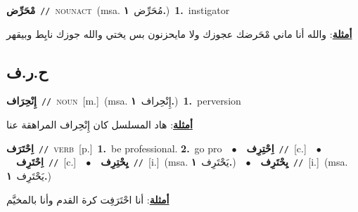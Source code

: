 \documentclass[10pt,a4paper,twoside]{article} %
\begin{document}
\begin{multicols}{2}
{\setlength\topsep{0pt}\textbf{\foreignlanguage{arabic}{مْحَرِّض}}\ {\color{gray}\texttt{//}\color{black}}\ \textsc{noun\textunderscore act}\ \color{gray}(msa. \foreignlanguage{arabic}{مُحَرِّض}~\foreignlanguage{arabic}{\textbf{١.}})\color{black}\ \textbf{1.}~instigator\  \begin{flushright}\color{gray}\foreignlanguage{arabic}{\textbf{\underline{\foreignlanguage{arabic}{أمثلة}}}: والله أنا ماني مْحَرضك عجوزك ولا مايحزنون بس يختي والله جوزك نايِط وبيقهر}\end{flushright}\color{black}} \vspace{2mm}

\vspace{-3mm}
\subsection*{\color{blue}\foreignlanguage{arabic}{ح.ر.ف}\color{blue}{}} 

{\setlength\topsep{0pt}\textbf{\foreignlanguage{arabic}{إِنْحِرَاف}}\ {\color{gray}\texttt{//}\color{black}}\ \textsc{noun}\ [m.]\ \color{gray}(msa. \foreignlanguage{arabic}{إِنْحِراف}~\foreignlanguage{arabic}{\textbf{١.}})\color{black}\ \textbf{1.}~perversion\  \begin{flushright}\color{gray}\foreignlanguage{arabic}{\textbf{\underline{\foreignlanguage{arabic}{أمثلة}}}: هاد المسلسل كان إِنْحِراف المراهقة عنا}\end{flushright}\color{black}} \vspace{2mm}

{\setlength\topsep{0pt}\textbf{\foreignlanguage{arabic}{اِحْتَرَف}}\ {\color{gray}\texttt{//}\color{black}}\ \textsc{verb}\ [p.]\ \textbf{1.}~be professional.  \textbf{2.}~go pro\ \ $\bullet$\ \ \setlength\topsep{0pt}\textbf{\foreignlanguage{arabic}{اِحْتِرِف}}\ {\color{gray}\texttt{//}\color{black}}\ [c.]\ \ $\bullet$\ \ \setlength\topsep{0pt}\textbf{\foreignlanguage{arabic}{اِحْتَرِف}}\ {\color{gray}\texttt{//}\color{black}}\ [c.]\ \ $\bullet$\ \ \setlength\topsep{0pt}\textbf{\foreignlanguage{arabic}{يِحْتِرِف}}\ {\color{gray}\texttt{//}\color{black}}\ [i.]\ \color{gray}(msa. \foreignlanguage{arabic}{يَحْتَرِف}~\foreignlanguage{arabic}{\textbf{١.}})\color{black}\ \ $\bullet$\ \ \setlength\topsep{0pt}\textbf{\foreignlanguage{arabic}{يِحْتَرِف}}\ {\color{gray}\texttt{//}\color{black}}\ [i.]\ \color{gray}(msa. \foreignlanguage{arabic}{يَحْتَرِف}~\foreignlanguage{arabic}{\textbf{١.}})\color{black}\  \begin{flushright}\color{gray}\foreignlanguage{arabic}{\textbf{\underline{\foreignlanguage{arabic}{أمثلة}}}: أنا احْتَرَفِت كرة القدم وأنا بالمخيَّم}\end{flushright}\color{black}} \vspace{2mm}


\end{multicols}
\end{document}
